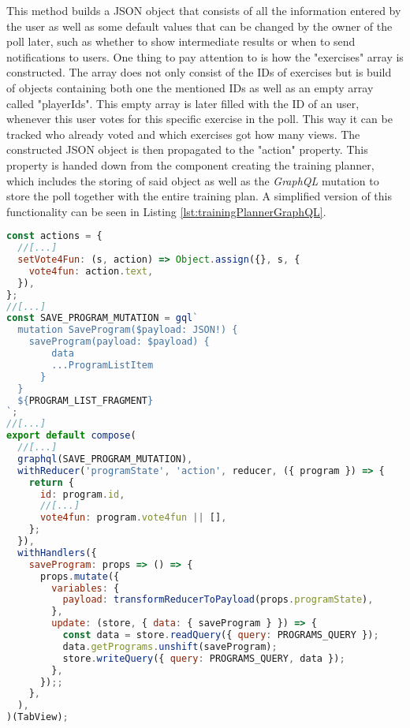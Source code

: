 This method builds a JSON object that consists of all the information entered by the user as well as some default values that can be changed by the owner of the poll later, such as whether to show intermediate results or when to send notifications to users. One thing to pay attention to is how the "exercises" array is constructed. The array does not only consist of the IDs of exercises but is build of objects containing both one the mentioned IDs as well as an empty array called "playerIds". This empty array is later filled with the ID of an user, whenever this user votes for this specific exercise in the poll. This way it can be tracked who already voted and which exercises got how many views.
\newline
The constructed JSON object is then propagated to the "action" property. This property is handed down from the component creating the training planner, which includes the storing of said object as well as the \textit{GraphQL} mutation to store the poll together with the entire training plan. A simplified version of this functionality can be seen in Listing \ref{lst:trainingPlannerGraphQL}.

\begin{lstlisting}[language=javascript,caption=Simplified Training Planner Component with \textit{GraphQL} Mutation,label=lst:trainingPlannerGraphQL]
const actions = {
  //[...]
  setVote4Fun: (s, action) => Object.assign({}, s, {
    vote4fun: action.text,
  }),
};
//[...]
const SAVE_PROGRAM_MUTATION = gql`
  mutation SaveProgram($payload: JSON!) {
    saveProgram(payload: $payload) {
        data
        ...ProgramListItem
      }
  }
  ${PROGRAM_LIST_FRAGMENT}
`;
//[...]
export default compose(
  //[...]
  graphql(SAVE_PROGRAM_MUTATION),
  withReducer('programState', 'action', reducer, ({ program }) => {
    return {
      id: program.id,
      //[...]
      vote4fun: program.vote4fun || [],
    };
  }),
  withHandlers({
    saveProgram: props => () => {
      props.mutate({
        variables: {
          payload: transformReducerToPayload(props.programState),
        },
        update: (store, { data: { saveProgram } }) => {
          const data = store.readQuery({ query: PROGRAMS_QUERY });
          data.getPrograms.unshift(saveProgram);
          store.writeQuery({ query: PROGRAMS_QUERY, data });
        },
      });;
    },
  ),
)(TabView);
\end{lstlisting}

